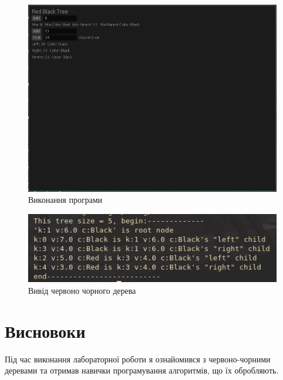 \documentclass{article}
\begin{document}
\begin{normalsize}
\begin{lstlisting}[language=C]
		\end{lstlisting}
		
		\begin{figure}[H]
			\centering
			\includegraphics[scale=0.6]{1}	
			\caption{Виконання програми}
		\end{figure}
	
	\begin{figure}[H]
		\centering
		\includegraphics[scale=0.8]{2}	
		\caption{Вивід червоно чорного дерева}
	\end{figure}
		
		\section*{Висновоки}
		Під час виконання лабораторної роботи я ознайомився з червоно-чорними деревами та отримав навички програмування алгоритмів, що їх обробляють. 
		
	\end{normalsize}
\end{document}
